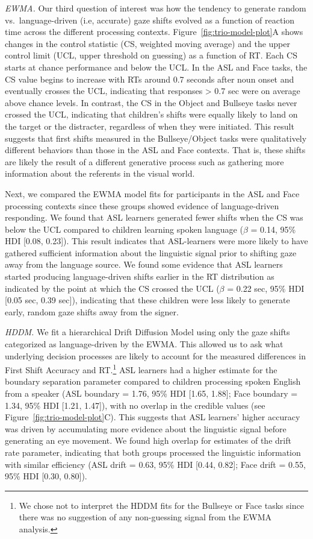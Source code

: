 \documentclass[english,floatsintext,man]{apa6}
\begin{document}
\emph{EWMA.} Our third question of interest was how the tendency to
generate random vs.~language-driven (i.e, accurate) gaze shifts evolved
as a function of reaction time across the different processing contexts.
Figure~\ref{fig:trio-model-plot}A shows changes in the control statistic
(CS, weighted moving average) and the upper control limit (UCL, upper
threshold on guessing) as a function of RT. Each CS starts at chance
performance and below the UCL. In the ASL and Face tasks, the CS value
begins to increase with RTs around 0.7 seconds after noun onset and
eventually crosses the UCL, indicating that responses \textgreater{} 0.7
sec were on average above chance levels. In contrast, the CS in the
Object and Bullseye tasks never crossed the UCL, indicating that
children's shifts were equally likely to land on the target or the
distracter, regardless of when they were initiated. This result suggests
that first shifts measured in the Bullseye/Object tasks were
qualitatively different behaviors than those in the ASL and Face
contexts. That is, these shifts are likely the result of a different
generative process such as gathering more information about the
referents in the visual world.

Next, we compared the EWMA model fits for participants in the ASL and
Face processing contexts since these groups showed evidence of
language-driven responding. We found that ASL learners generated fewer
shifts when the CS was below the UCL compared to children learning
spoken language (\(\beta\) = 0.14, 95\% HDI {[}0.08, 0.23{]}). This
result indicates that ASL-learners were more likely to have gathered
sufficient information about the linguistic signal prior to shifting
gaze away from the language source. We found some evidence that ASL
learners started producing language-driven shifts earlier in the RT
distribution as indicated by the point at which the CS crossed the UCL
(\(\beta\) = 0.22 sec, 95\% HDI {[}0.05 sec, 0.39 sec{]}), indicating
that these children were less likely to generate early, random gaze
shifts away from the signer.

\emph{HDDM.} We fit a hierarchical Drift Diffusion Model using only the
gaze shifts categorized as language-driven by the EWMA. This allowed us
to ask what underlying decision processes are likely to account for the
measured differences in First Shift Accuracy and RT.\footnote{We chose
  not to interpret the HDDM fits for the Bullseye or Face tasks since
  there was no suggestion of any non-guessing signal from the EWMA
  analysis.} ASL learners had a higher estimate for the boundary
separation parameter compared to children processing spoken English from
a speaker (ASL boundary = 1.76, 95\% HDI {[}1.65, 1.88{]}; Face boundary
= 1.34, 95\% HDI {[}1.21, 1.47{]}), with no overlap in the credible
values (see Figure~\ref{fig:trio-model-plot}C). This suggests that ASL
learners' higher accuracy was driven by accumulating more evidence about
the linguistic signal before generating an eye movement. We found high
overlap for estimates of the drift rate parameter, indicating that both
groups processed the linguistic information with similar efficiency (ASL
drift = 0.63, 95\% HDI {[}0.44, 0.82{]}; Face drift = 0.55, 95\% HDI
{[}0.30, 0.80{]}).
\end{document}
